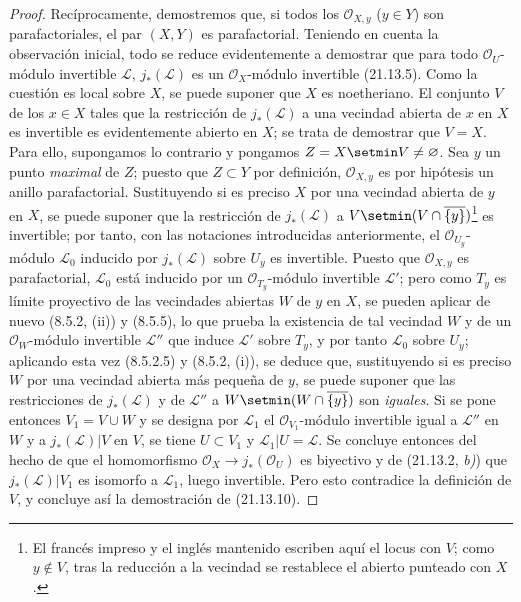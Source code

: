 \begin{proof}
Recíprocamente, demostremos que, si todos los $\mathcal O_{X,y}$ ($y\in Y$) son
parafactoriales, el par $(X,Y)$ es parafactorial. Teniendo en cuenta la observación
inicial, todo se reduce evidentemente a demostrar que para todo $\mathcal O_U$-módulo invertible
$\mathscr L$, $j_*(\mathscr L)$ es un $\mathcal O_X$-módulo invertible (21.13.5).
Como la cuestión es local sobre $X$, se puede suponer que $X$ es noetheriano. El conjunto $V$ de los
$x\in X$ tales que la restricción de $j_*(\mathscr L)$ a una vecindad abierta de $x$
en $X$ es invertible es evidentemente abierto en $X$; se trata de demostrar que
$V=X$. Para ello, supongamos lo contrario y pongamos $Z=X\setmin V\neq\varnothing$. Sea $y$
un punto \emph{maximal} de $Z$; puesto que $Z\subset Y$ por definición,
$\mathcal O_{X,y}$ es por hipótesis un anillo parafactorial. Sustituyendo si es preciso
$X$ por una vecindad abierta de $y$ en $X$, se puede suponer que la restricción de
$j_*(\mathscr L)$
a $V\setmin(V\cap\overline{\{y\}})$\footnote{El francés impreso y el inglés mantenido escriben aquí el locus con $V$; como $y\notin V$, tras la reducción
a la vecindad se restablece el abierto punteado con $X$.} es invertible; por tanto, con las notaciones introducidas
anteriormente, el $\mathcal O_{U_y}$-módulo $\mathscr L_0$ inducido por $j_*(\mathscr L)$
sobre $U_y$ es invertible. Puesto que $\mathcal O_{X,y}$ es parafactorial,
$\mathscr L_0$ está inducido por un $\mathcal O_{T_y}$-módulo invertible $\mathscr L'$;
pero como $T_y$ es límite proyectivo de las vecindades abiertas $W$ de $y$ en $X$,
se pueden aplicar de nuevo (8.5.2, (ii)) y (8.5.5), lo que prueba la existencia de tal
vecindad $W$ y de un $\mathcal O_W$-módulo invertible $\mathscr L''$ que induce
$\mathscr L'$ sobre $T_y$, y por tanto $\mathscr L_0$ sobre $U_y$; aplicando esta
vez (8.5.2.5) y (8.5.2, (i)), se deduce que, sustituyendo si es preciso $W$ por una
vecindad abierta más pequeña de $y$, se puede suponer que las restricciones de
$j_*(\mathscr L)$ y de $\mathscr L''$ a
$W\setmin(W\cap\overline{\{y\}})$ son \emph{iguales}. Si se pone entonces $V_1=V\cup W$ y se
designa por $\mathscr L_1$ el $\mathcal O_{V_1}$-módulo invertible igual a
$\mathscr L''$ en $W$ y a $j_*(\mathscr L)|V$ en $V$, se tiene $U\subset V_1$ y
$\mathscr L_1|U=\mathscr L$. Se concluye entonces del hecho de que el homomorfismo
$\mathcal O_X\to j_*(\mathcal O_U)$ es biyectivo y de (21.13.2, \emph{b)}) que
$j_*(\mathscr L)|V_1$ es isomorfo a $\mathscr L_1$, luego invertible. Pero esto
contradice la definición de $V$, y concluye así la demostración de (21.13.10).
\end{proof}

